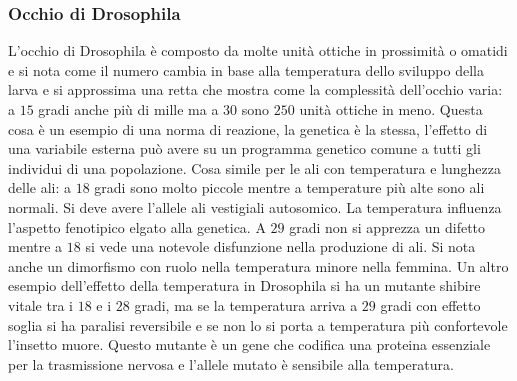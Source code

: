 \subsubsection{Occhio di Drosophila}
L'occhio di Drosophila \`e composto da molte unit\`a ottiche in prossimit\`a o omatidi e si nota come il numero cambia in base alla temperatura dello sviluppo della larva e si 
approssima una retta che mostra come la complessit\`a dell'occhio varia: a $15$ gradi anche pi\`u di mille ma a $30$ sono $250$ unit\`a ottiche in meno. Questa cosa \`e un esempio di 
una norma di reazione, la genetica \`e la stessa, l'effetto di una variabile esterna pu\`o avere su un programma genetico comune a tutti gli individui di una popolazione. Cosa
simile per le ali con temperatura e lunghezza delle ali: a $18$ gradi sono molto piccole mentre a temperature pi\`u alte sono ali normali. Si deve avere l'allele ali vestigiali 
autosomico. La temperatura influenza l'aspetto fenotipico elgato alla genetica. A $29$ gradi non si apprezza un difetto mentre a $18$ si vede una notevole disfunzione nella produzione di
ali. Si nota anche un dimorfismo con ruolo nella temperatura minore nella femmina. Un altro esempio dell'effetto della temperatura in Drosophila si ha un mutante shibire vitale 
tra i $18$ e i $28$ gradi, ma se la temperatura arriva a $29$ gradi con effetto soglia si ha paralisi reversibile e se non lo si porta a temperatura pi\`u confortevole l'insetto muore. 
Questo mutante \`e un gene che codifica una proteina essenziale per la trasmissione nervosa e l'allele mutato \`e sensibile alla temperatura. 
